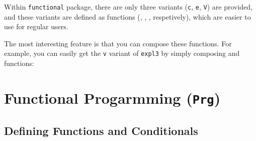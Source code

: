 \documentclass[oneside]{book}
\begin{document}
Within \verb!functional! package, there are only three variants
(\verb!c!, \verb!e!, \verb!V!) are provided, and these variants are defined
as functions (, , , respetively),
which are easier to use for regular users.

\begin{demohigh}
\newcommand\test{uvw}
\end{demohigh}

\begin{demohigh}
\newcommand\test{uvw}
\expWhole{111\test222}
\end{demohigh}

\begin{demohigh}
\intSet{}
\expValue\lTmpaInt
\end{demohigh}

The most interesting feature is that you can compose these functions.
For example, you can easily get the \verb!v! variant of \verb!expl3! by
simply composing  and  functions:

\begin{demohigh}
\intSet{}
\end{demohigh}

\chapter{Functional Progarmming (\texttt{Prg})}

\section{Deﬁning Functions and Conditionals}
\end{document}
